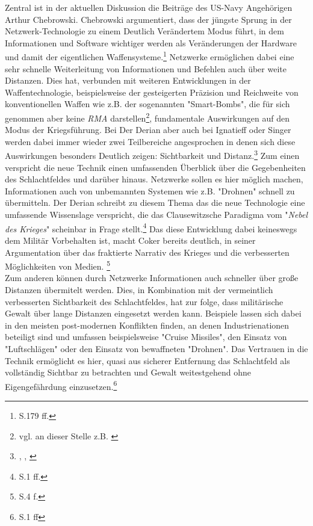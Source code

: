 \documentclass[11pt,a4paper,oneside,numbers=noenddot,bibliography=totocnumbered,DIV=13]{scrartcl}
\begin{document}
Zentral ist in der aktuellen Diskussion die Beiträge des US-Navy Angehörigen Arthur Chebrowski. Chebrowski argumentiert, dass der jüngste Sprung in der Netzwerk-Technologie zu einem Deutlich Verändertem Modus führt, in dem Informationen und Software wichtiger werden als Veränderungen der Hardware und damit der eigentlichen Waffensysteme.\footnote{\cite{singer_wired_2010}S.179 ff.} Netzwerke ermöglichen dabei eine sehr schnelle Weiterleitung von Informationen und Befehlen auch über weite Distanzen. Dies hat, verbunden mit weiteren Entwicklungen in der Waffentechnologie, beispielsweise der gesteigerten Präzision und Reichweite von konventionellen Waffen wie z.B. der sogenannten "Smart-Bombs", die für sich genommen aber keine \textit{RMA} darstellen\footnote{vgl. an dieser Stelle z.B. \cite{ignatieff_virtual_2000}}, fundamentale Auswirkungen auf den Modus der Kriegsführung. Bei Der Derian aber auch bei Ignatieff oder Singer werden dabei immer wieder zwei Teilbereiche angesprochen in denen sich diese Auswirkungen besonders Deutlich zeigen: Sichtbarkeit und Distanz.\footnote{\cite{DerDerian2001}, \cite{ignatieff_virtual_2000}, \cite{singer_wired_2010}} 
Zum einen verspricht die neue Technik einen umfassenden Überblick über die Gegebenheiten des Schlachtfeldes und darüber hinaus. Netzwerke sollen es hier möglich machen, Informationen auch von unbemannten Systemen wie z.B. "Drohnen" schnell zu übermitteln. Der Derian schreibt zu diesem Thema das die neue Technologie eine umfassende Wissenslage verspricht, die das Clausewitzsche Paradigma vom "\textit{Nebel des Krieges}" scheinbar in Frage stellt.\footnote{\cite{DerDerian2001} S.1 ff.}  Das diese Entwicklung dabei keineswegs dem Militär Vorbehalten ist, macht Coker bereits deutlich, in seiner Argumentation über das fraktierte Narrativ des Krieges und die verbesserten Möglichkeiten von Medien. \footnote{\cite{coker_collision_2012} S.4 f.} \\
Zum anderen können durch Netzwerke Informationen auch schneller über große Distanzen übermitelt werden. Dies, in Kombination mit der vermeintlich verbesserten Sichtbarkeit des Schlachtfeldes, hat zur folge, dass militärische Gewalt über lange Distanzen eingesetzt werden kann. Beispiele lassen sich dabei in den meisten post-modernen Konflikten finden, an denen Industrienationen beteiligt sind und umfassen beispielsweise "Cruise Missiles", den Einsatz von "Luftschlägen" oder den Einsatz von bewaffneten "Drohnen". Das Vertrauen in die Technik ermöglicht es hier, quasi aus sicherer Entfernung das Schlachtfeld als vollständig Sichtbar zu betrachten und Gewalt weitestgehend ohne Eigengefährdung einzusetzen.\footnote{\cite{DerDerian2001} S.1 ff}
\end{document}
